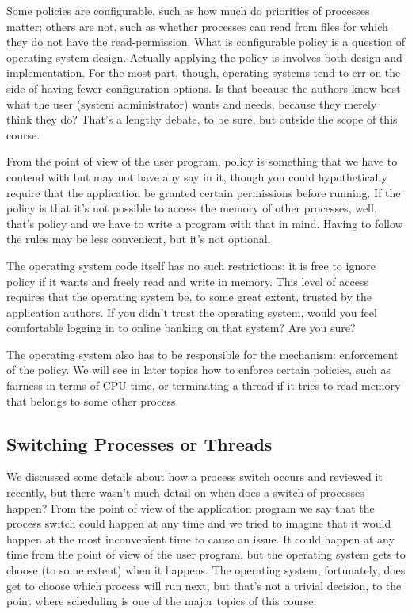 Some policies are configurable, such as how much do priorities of processes matter; others are not, such as whether processes can read from files for which they do not have the read-permission. What is configurable policy is a question of operating system design. Actually applying the policy is involves both design and implementation. For the most part, though, operating systems tend to err on the side of having fewer configuration options. Is that because the authors know best what the user (system administrator) wants and needs, because they merely think they do? That's a lengthy debate, to be sure, but outside the scope of this course.

From the point of view of the user program, policy is something that we have to contend with but may not have any say in it, though you could hypothetically require that the application be granted certain permissions before running. If the policy is that it's not possible to access the memory of other processes, well, that's policy and we have to write a program with that in mind. Having to follow the rules may be less convenient, but it's not optional.

The operating system code itself has no such restrictions: it is free to ignore policy if it wants and freely read and write in memory. This level of access requires that the operating system be, to some great extent, trusted by the application authors. If you didn't trust the operating system, would you feel comfortable logging in to online banking on that system? Are you sure?

The operating system also has to be responsible for the mechanism: enforcement of the policy. We will see in later topics how to enforce certain policies, such as fairness in terms of CPU time, or terminating a thread if it tries to read memory that belongs to some other process. 

\subsection*{Switching Processes or Threads}
We discussed some details about how a process switch occurs and reviewed it recently, but there wasn't much detail on when does a switch of processes happen? From the point of view of the application program we say that the process switch could happen at any time and we tried to imagine that it would happen at the most inconvenient time to cause an issue. It could happen at any time from the point of view of the user program, but the operating system gets to choose (to some extent) when it happens. The operating system, fortunately, does get to choose which process will run next, but that's not a trivial decision, to the point where scheduling is one of the major topics of this course.

